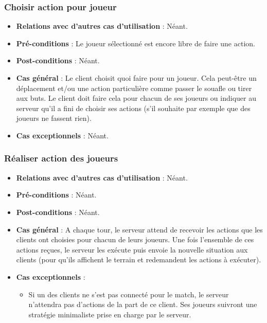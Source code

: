 \documentclass[a4paper,titlepage]{scrreprt}
\begin{document}
    \subsubsection{Choisir action pour joueur}
      \begin{itemize}
        \item \textbf{Relations avec d'autres cas d'utilisation}  : Néant.
        \item \textbf{Pré-conditions} : Le joueur sélectionné est encore libre de faire une action.
        \item \textbf{Post-conditions} : Néant.
        \item \textbf{Cas général} : Le client choisit quoi faire pour un joueur. Cela peut-être un déplacement et/ou une action particulière comme passer le souafle ou tirer aux buts. Le client doit faire cela pour chacun de ses joueurs ou indiquer au serveur qu’il a fini de choisir ses actions (s’il souhaite par exemple que des joueurs ne fassent rien).
        \item \textbf{Cas exceptionnels} : Néant.
      \end{itemize}
    \subsubsection{Réaliser action des joueurs}
      \begin{itemize}
        \item \textbf{Relations avec d'autres cas d'utilisation}  : Néant.
        \item \textbf{Pré-conditions} : Néant.
        \item \textbf{Post-conditions} : Néant.
        \item \textbf{Cas général} : A chaque tour, le serveur attend de recevoir les actions que les clients ont choisies pour chacun de leurs joueurs. Une fois l’ensemble de ces actions reçues, le serveur les exécute puis envoie la nouvelle situation aux clients (pour qu’ils affichent le terrain et redemandent les actions à exécuter).
        \item \textbf{Cas exceptionnels} : 
          \begin{itemize}
            \item Si un des clients ne s’est pas connecté pour le match, le serveur n’attendra pas d’actions de la part de ce client. Ses joueurs suivront une stratégie minimaliste prise en charge par le serveur.
          \end{itemize}  
      \end{itemize}
\end{document}
